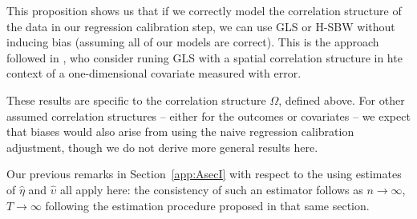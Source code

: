 \begin{remark}
    This proposition shows us that if we correctly model the correlation structure of the data in our regression calibration step, we can use GLS or H-SBW without inducing bias (assuming all of our models are correct). This is the approach followed in \cite{huque2014impact}, who consider runing GLS with a spatial correlation structure in hte context of a one-dimensional covariate measured with error. 
\end{remark}

\begin{remark}
    These results are specific to the correlation structure $\Omega$, defined above. For other assumed correlation structures -- either for the outcomes or covariates -- we expect that biases would also arise from using the naive regression calibration adjustment, though we do not derive more general results here.
\end{remark}

\begin{remark}
    Our previous remarks in Section~\ref{app:AsecI} with respect to the using estimates of $\hat{\eta}$ and $\hat{\upsilon}$ all apply here: the consistency of such an estimator follows as $n \to \infty$, $T \to \infty$ following the estimation procedure proposed in that same section.
\end{remark}
